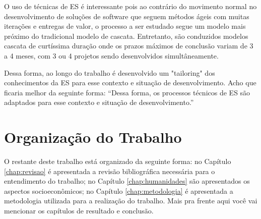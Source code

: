 		O uso de técnicas de ES é interessante pois ao contrário do movimento normal no desenvolvimento de soluções de software que seguem métodos ágeis com muitas iterações e entregas
		de valor, o processo a ser estudado segue um modelo mais próximo do tradicional modelo de cascata. Entretanto, são conduzidos modelos cascata de curtíssima duração onde os prazos
		máximos de conclusão variam de 3 a 4 meses, com 3 ou 4 projetos sendo desenvolvidos simultâneamente.

		Dessa forma, ao longo do trabalho é desenvolvido um "tailoring" dos conhecimentos da ES para esse contexto e situação de desenvolvimento.
		{\color{red} Acho que ficaria melhor da seguinte forma: ``Dessa forma, os processos técnicos de ES são adaptados para esse contexto e situação de desenvolvimento.''}
	
	\section{Organização do Trabalho}\label{sec:introducao:organizacao}

		O restante deste trabalho está organizado da seguinte forma: no Capítulo \ref{chap:revisao} é apresentada a revisão bibliográfica necessária para o entendimento do trabalho; no Capítulo \ref{chap:humanidades} são apresentados os aspectos socioeconômicos; no Capítulo \ref{chap:metodologia} é apresentada a metodologia utilizada para a realização do trabalho. {\color{red} Mais pra frente aqui você vai mencionar os capítulos de resultado e conclusão.}
		
